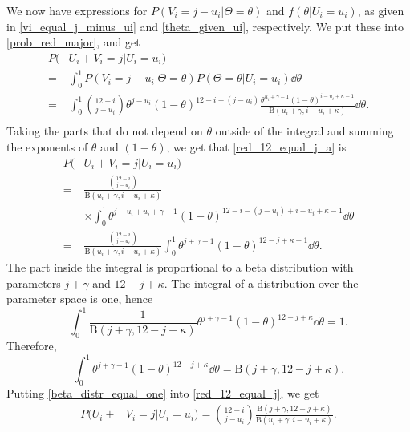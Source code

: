 We now have expressions for $P(V_i=j-u_i|\Theta=\theta)$ and $f(\theta|U_i=u_i)$, as given in \eqref{vi_equal_j_minus_ui} and \eqref{theta_given_ui}, respectively. We put these into \eqref{prob_red_major}, and get
\begin{equation}
\label{red_12_equal_j_a}
    \begin{aligned}
         P(&U_i+V_i = j | U_i=u_i) \\[6pt]
        =& \int_0^1 P(V_i = j-u_i | \Theta=\theta) P(\Theta=\theta| U_i=u_i) \dd \theta \\[6pt]
        =& \int_0^1 \binom{12-i}{j-u_i}\theta^{j-u_i}(1-\theta)^{12-i-(j-u_i)} \frac{\theta^{u_i+\gamma-1}(1-\theta)^{i-u_i+\kappa-1}}{\text{B}(u_i+\gamma,i-u_i+\kappa)} \dd \theta.\\[6pt]
    \end{aligned}
\end{equation}
Taking the parts that do not depend on $\theta$ outside of the integral and summing the exponents of $\theta$ and $(1-\theta)$, we get that \eqref{red_12_equal_j_a} is
\begin{equation}
\label{red_12_equal_j}
    \begin{aligned}
         P(&U_i+V_i = j | U_i=u_i) \\[6pt]
        =& \frac{\binom{12-i}{j-u_i}}{\text{B}(u_i+\gamma,i-u_i+\kappa)} \\[6pt]
        &\times \int_0^1 
        \theta^{j-u_i+u_i+\gamma-1}(1-\theta)^{12-i-(j-u_i)+i-u_i+\kappa-1} \dd \theta\\[6pt]
        =& \frac{\binom{12-i}{j-u_i}}{\text{B}(u_i+\gamma,i-u_i+\kappa)} \int_0^1 
        \theta^{j+\gamma-1}(1-\theta)^{12-j+\kappa-1} \dd \theta.
    \end{aligned}
\end{equation}
The part inside the integral is proportional to a beta distribution with parameters $j+\gamma$ and $12-j+\kappa$. The integral of a distribution over the parameter space is one, hence
\begin{equation*}
    \int_0^1 \frac{1}{\text{B}(j+\gamma,12-j+\kappa)}\theta^{j+\gamma-1}(1-\theta)^{12-j+\kappa} \dd \theta = 1.
\end{equation*}
Therefore,
\begin{equation}
\label{beta_distr_equal_one}
    \int_0^1 \theta^{j+\gamma-1}(1-\theta)^{12-j+\kappa} \dd \theta = \text{B}(j+\gamma,12-j+\kappa).
\end{equation}
Putting \eqref{beta_distr_equal_one} into \eqref{red_12_equal_j}, we get
\begin{equation}
\label{red_12_equal_j_final}
    \begin{aligned}
        P(U_i+&V_i = j | U_i=u_i) = \binom{12-i}{j-u_i} \frac{\text{B}(j+\gamma,12-j+\kappa)}{\text{B}(u_i+\gamma,i-u_i+\kappa)}.
    \end{aligned}
\end{equation}

